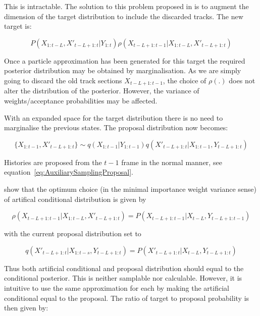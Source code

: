 This is intractable. The solution to this problem proposed in \cite{Doucet2006} is to augment the dimension of the target distribution to include the discarded tracks. The new target is:

\begin{equation}
P(X_{1:t-L}, X'_{t-L+1:t}|Y_{1:t}) \rho(X_{t-L+1:t-1}|X_{1:t-L}, X'_{t-L+1:t})
\label{eq:}
\end{equation}

Once a particle approximation has been generated for this target the required posterior distribution may be obtained by marginalisation. As we are simply going to discard the old track sections $X_{t-L+1:t-1}$, the choice of $\rho(.)$ does not alter the distribution of the posterior. However, the variance of weights/acceptance probabilities may be affected.

With an expanded space for the target distribution there is no need to marginalise the previous states. The proposal distribution now becomes:

\begin{equation}
\{X_{1:t-1}, X'_{t-L+1:t}\} \sim q(X_{1:t-1}|Y_{1:t-1}) q(X'_{t-L+1:t}|X_{1:t-1}, Y_{t-L+1:t})
\label{eq:ExtendedFLProposal}
\end{equation}

Histories are proposed from the $t-1$ frame in the normal manner, see equation~\ref{eq:AuxiliarySamplingProposal}.

\cite{Doucet2006} show that the optimum choice (in the minimal importance weight variance sense) of artifical conditional distribution is given by 

\begin{equation}
\rho(X_{t-L+1:t-1}|X_{1:t-L}, X'_{t-L+1:t}) = P(X_{t-L+1:t-1}|X_{t-L}, Y_{t-L+1:t-1})
\label{eq:}
\end{equation}

with the current proposal distribution set to

\begin{equation}
q(X'_{t-L+1:t}|X_{1:t-s}, Y_{t-L+1:t}) = P(X'_{t-L+1:t}|X_{t-L}, Y_{t-L+1:t})
\label{eq:}
\end{equation}

Thus both artificial conditional and proposal distribution should equal to the conditional posterior. This is neither samplable nor calculable. However, it is intuitive to use the same approximation for each by making the artificial conditional equal to the proposal. The ratio of target to proposal probability is then given by:

